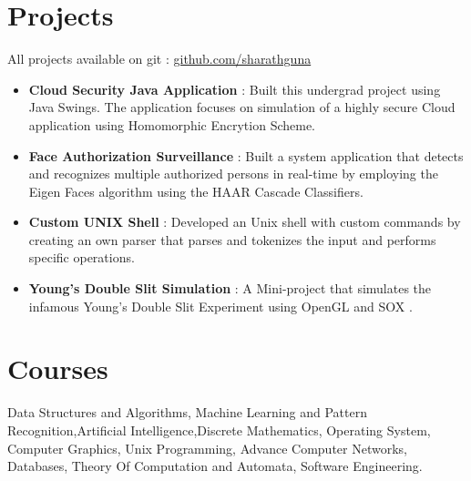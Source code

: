 \documentclass[margin, centered]{res}
\begin{document}
\begin{resume}
\section{Projects}
All projects available on git : \href{https://github.com/sharathguna}{ github.com/sharathguna }
\\
\begin{itemize}[leftmargin=*]


\item \textbf{{Cloud Security Java Application }}: Built this undergrad project using Java Swings. The application focuses on simulation of a highly secure Cloud application using Homomorphic Encrytion Scheme. 

 \item \textbf{{Face Authorization Surveillance }} : Built a system application that detects and recognizes
multiple authorized persons in real-time by employing the Eigen Faces algorithm using the HAAR Cascade Classifiers.

\item \textbf{{Custom UNIX Shell}} : Developed an Unix shell with custom commands by creating an own parser that parses and tokenizes the input and performs specific operations.

\item \textbf{{Young's Double Slit Simulation }}: A Mini-project that simulates the infamous Young's Double Slit Experiment using OpenGL and SOX .

\end{itemize}


\section{Courses}
Data Structures and Algorithms, Machine Learning and Pattern Recognition,Artificial Intelligence,Discrete Mathematics, Operating System, Computer Graphics, Unix Programming, Advance Computer Networks, Databases, Theory Of Computation and Automata, Software Engineering.


\end{resume}
\end{document}
